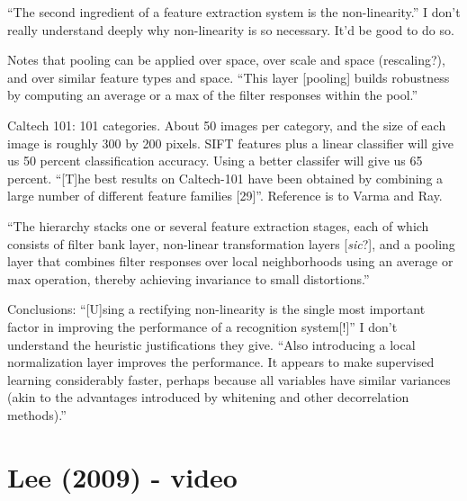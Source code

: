 \documentclass[12pt]{report}
\begin{document}
``The second ingredient of a feature extraction system is the
non-linearity.''  I don't really understand deeply why non-linearity
is so necessary.  It'd be good to do so.

Notes that pooling can be applied over space, over scale and space
(rescaling?), and over similar feature types and space.  ``This layer
[pooling] builds robustness by computing an average or a max of the
filter responses within the pool.''

Caltech 101: 101 categories.  About 50 images per category, and the
size of each image is roughly 300 by 200 pixels.  SIFT features plus a
linear classifier will give us 50 percent classification accuracy.
Using a better classifer will give us 65 percent.  ``[T]he best
results on Caltech-101 have been obtained by combining a large number
of different feature families [29]''.  Reference is to Varma and Ray.

``The hierarchy stacks one or several feature extraction stages, each
of which consists of filter bank layer, non-linear transformation
layers [\emph{sic}?], and a pooling layer that combines filter
responses over local neighborhoods using an average or max operation,
thereby achieving invariance to small distortions.''



Conclusions: ``[U]sing a rectifying non-linearity is the single most
important factor in improving the performance of a recognition
system[!]''  I don't understand the heuristic justifications they
give. ``Also introducing a local normalization layer improves the
performance.  It appears to make supervised learning considerably
faster, perhaps because all variables have similar variances (akin to
the advantages introduced by whitening and other decorrelation
methods).''

\section{Lee (2009) - video}
\end{document}

